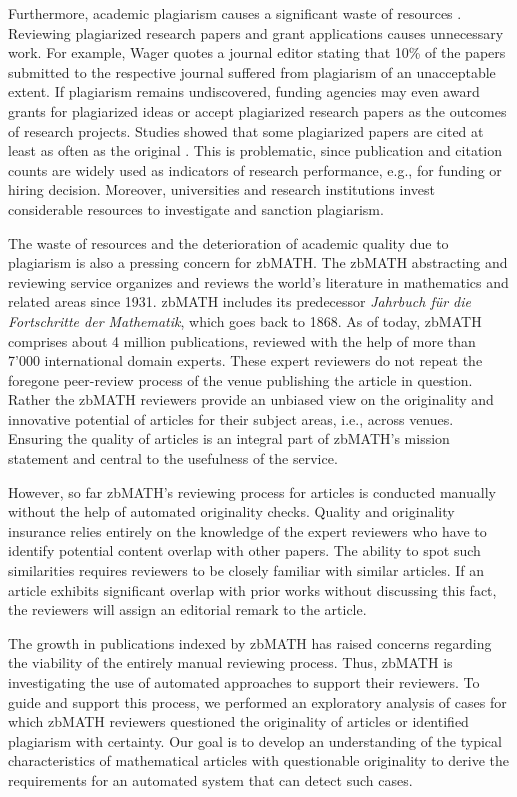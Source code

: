 \documentclass{llncs}
\begin{document}
Furthermore, academic plagiarism causes a significant waste of resources \cite{Foltynek2019}. Reviewing plagiarized research papers and grant applications causes unnecessary work. For example, Wager \cite{Wager2014} quotes a journal editor stating that 10\% of the papers submitted to the respective journal suffered from plagiarism of an unacceptable extent. If plagiarism remains undiscovered, funding agencies may even award grants for plagiarized ideas or accept plagiarized research papers as the outcomes of research projects. Studies showed that some plagiarized papers are cited at least as often as the original \cite{Long2009}. This is problematic, since publication and citation counts are widely used as indicators of research performance, e.g., for funding or hiring decision. Moreover, universities and research institutions invest considerable resources to investigate and sanction plagiarism.

The waste of resources and the deterioration of academic quality due to plagiarism is also a pressing concern for zbMATH. The zbMATH abstracting and reviewing service organizes and reviews the world's literature in mathematics and related areas since 1931. zbMATH includes its predecessor {\it Jahrbuch f\"ur die Fortschritte der Mathematik}, which goes back to 1868. As of today, zbMATH comprises about 4 million publications, reviewed with the help of more than 7'000 international domain experts. These expert reviewers do not repeat the foregone peer-review process of the venue publishing the article in question. Rather the zbMATH reviewers provide an unbiased view on the originality and innovative potential of articles for their subject areas, i.e., across venues. Ensuring the quality of articles is an integral part of zbMATH's mission statement and central to the usefulness of the service.

However, so far zbMATH's reviewing process for articles is conducted manually without the help of automated originality checks. Quality and originality insurance relies entirely on the knowledge of the expert reviewers who have to identify potential content overlap with other papers. The ability to spot such similarities requires reviewers to be closely familiar with similar articles. If an article exhibits significant overlap with prior works without discussing this fact, the reviewers will assign an editorial remark to the article.

The growth in publications indexed by zbMATH has raised concerns regarding the viability of the entirely manual reviewing process. Thus, zbMATH is investigating the use of automated approaches to support their reviewers. To guide and support this process, we performed an exploratory analysis of cases for which zbMATH reviewers questioned the originality of articles or identified plagiarism with certainty. Our goal is to develop an understanding of the typical characteristics of mathematical articles with questionable originality to derive the requirements for an automated system that can detect such cases.
\end{document}
